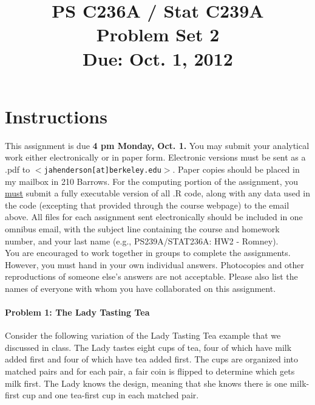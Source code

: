 \documentclass{article}
\title{PS C236A / Stat C239A \\ Problem Set 2 \\ Due: Oct. 1, 2012}
\date{}
\begin{document}
\maketitle
\vspace{-4em}
\section*{Instructions}
This assignment is due {\bf 4 pm Monday, Oct. 1.}  You may submit your
analytical work either electronically or in paper form.  Electronic
versions must be sent as a .pdf to
$<$\texttt{jahenderson[at]berkeley.edu}$>$. Paper copies should be
placed in my mailbox in 210 Barrows.  For the computing portion of the
assignment, you \underline{must} submit a fully executable version of
all .R code, along with any data used in the code (excepting that
provided through the course webpage) to the email above.  All files
for each assignment sent electronically should be included in one
omnibus email, with the subject line containing the course and
homework number, and your last name (e.g., PS239A/STAT236A: HW2 - Romney).\\







\noindent You are encouraged to work together in groups to complete
the assignments. However, you must hand in your own individual
answers. Photocopies and other reproductions of someone else’s answers
are not acceptable. Please also list the names of everyone with
whom you have collaborated on this assignment.






\paragraph{Problem 1: The Lady Tasting Tea }
Consider the following variation of the Lady Tasting Tea example that
we discussed in class. The Lady tastes eight cups of tea, four of
which have milk added first and four of which have tea added
first. The cups are organized into matched pairs and for each pair, a
fair coin is flipped to determine which gets milk first. The Lady
knows the design, meaning that she knows there is one milk-first cup
and one tea-first cup in each matched pair.
\end{document}
